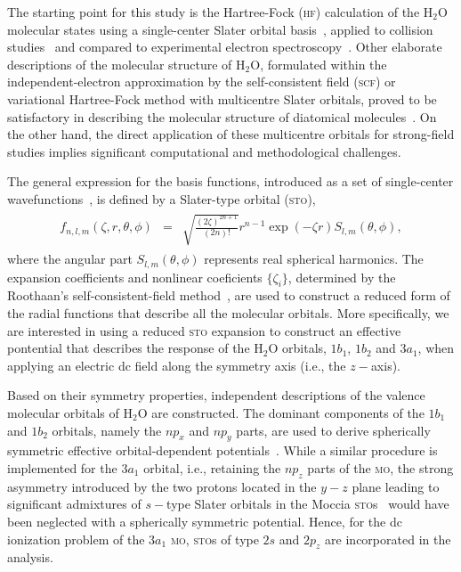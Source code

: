 The starting point for this study is the Hartree-Fock (\textsc{hf})
calculation of the H$_{2}$O molecular states using a single-center
Slater orbital
basis~\cite{Moccia_1964,Moccia_JCP_2164,Moccia_JCP_2176}, applied to
collision studies~\cite{Montanari_2013} and compared to experimental
electron spectroscopy~\cite{Hafied_2007}. Other elaborate descriptions
of the molecular structure of H$_{2}$O, formulated within the
independent-electron approximation by the self-consistent field
(\textsc{scf}) or variational Hartree-Fock method with multicentre
Slater orbitals, proved to be satisfactory in describing the molecular
structure of diatomical molecules~\cite{Pitzer_1968}. On the other
hand, the direct application of these multicentre orbitals for
strong-field studies implies significant computational and
methodological challenges.

The general expression for the basis functions, introduced as a set of
single-center
wavefunctions~\cite{Moccia_1964,Moccia_JCP_2164,Moccia_JCP_2176}, is
defined by a Slater-type orbital (\textsc{sto}),
%
\begin{eqnarray}
  \begin{split}
 f_{n, l, m}(\zeta,r,\theta,\phi) & = & \sqrt{\frac{(2\zeta)^{2n+1}}{(2n)!}}
 r^{n-1} \exp(-\zeta r) S_{l, m}(\theta,\phi),
 \end{split}
\label{eq:sto}
\end{eqnarray}
%
where the angular part $S_{l,m}(\theta,\phi)$ represents real
spherical harmonics. The expansion coefficients and nonlinear
coeficients $\{\zeta_{i}\}$, determined by the Roothaan's
self-consistent-field method~\cite{Moccia_1964,Roothaan_1951}, are
used to construct a reduced form of the radial functions that describe
all the molecular orbitals. More specifically, we are interested in
using a reduced \textsc{sto} expansion to construct an effective
pontential that describes the response of the H$_{2}$O orbitals,
$1b_{1}$, $1b_{2}$ and $3a_{1}$, when applying an electric dc field
along the symmetry axis (i.e., the $z-$axis).



Based on their symmetry properties, independent descriptions of the
valence molecular orbitals of H$_{2}$O are constructed. The dominant
components of the $1b_{1}$ and $1b_{2}$ orbitals, namely the $np_{x}$
and $np_{y}$ parts, are used to derive spherically symmetric effective
orbital-dependent potentials~\cite{sarias_2016}. While a similar
procedure is implemented for the $3a_{1}$ orbital, i.e., retaining the
$np_{z}$ parts of the \textsc{mo}, the strong asymmetry introduced by
the two protons located in the $y-z$ plane leading to significant
admixtures of $s-$type Slater orbitals in the Moccia
\textsc{sto}s~\cite{Moccia_1964} would have been neglected with a
spherically symmetric potential. Hence, for the dc ionization problem
of the $3a_{1}$ \textsc{mo}, \textsc{sto}s of type $2s$ and $2p_{z}$
are incorporated in the analysis.


